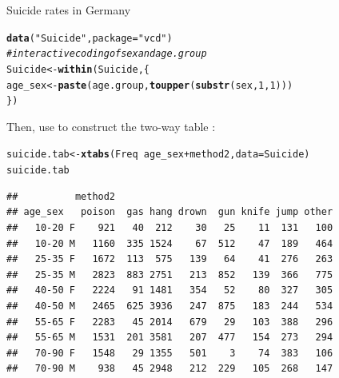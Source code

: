 \documentclass[11pt]{book}\usepackage[]{graphicx}\usepackage[]{color}
\makeatletter
\newcommand{\hlnum}[1]{\textcolor[rgb]{0.686,0.059,0.569}{#1}}%
\newcommand{\hlstr}[1]{\textcolor[rgb]{0.192,0.494,0.8}{#1}}%
\newcommand{\hlcom}[1]{\textcolor[rgb]{0.678,0.584,0.686}{\textit{#1}}}%
\newcommand{\hlopt}[1]{\textcolor[rgb]{0,0,0}{#1}}%
\newcommand{\hlstd}[1]{\textcolor[rgb]{0.345,0.345,0.345}{#1}}%
\newcommand{\hlkwb}[1]{\textcolor[rgb]{0.69,0.353,0.396}{#1}}%
\newcommand{\hlkwc}[1]{\textcolor[rgb]{0.333,0.667,0.333}{#1}}%
\newcommand{\hlkwd}[1]{\textcolor[rgb]{0.737,0.353,0.396}{\textbf{#1}}}%
\newenvironment{kframe}{%
 \def\at@end@of@kframe{}%
 \ifinner\ifhmode%
  \def\at@end@of@kframe{\end{minipage}}%
  \begin{minipage}{\columnwidth}%
 \fi\fi%
 \def\FrameCommand##1{\hskip\@totalleftmargin \hskip-\fboxsep
 \colorbox{shadecolor}{##1}\hskip-\fboxsep
     \hskip-\linewidth \hskip-\@totalleftmargin \hskip\columnwidth}%
 \MakeFramed {\advance\hsize-\width
   \@totalleftmargin\z@ \linewidth\hsize
   \@setminipage}}%
 {\par\unskip\endMakeFramed%
 \at@end@of@kframe}
\newenvironment{knitrout}{}{} %
\renewenvironment{knitrout}{\small\renewcommand{\baselinestretch}{.85}}{} %
\makeatother
\begin{document}
\begin{Example}[suicide1]{Suicide rates in Germany}
\begin{knitrout}
\color{fgcolor}\begin{kframe}
\begin{alltt}
\hlkwd{data}\hlstd{(}\hlstr{"Suicide"}\hlstd{,} \hlkwc{package}\hlstd{=}\hlstr{"vcd"}\hlstd{)}
\hlcom{# interactive coding of sex and age.group}
\hlstd{Suicide} \hlkwb{<-} \hlkwd{within}\hlstd{(Suicide, \{}
  \hlstd{age_sex} \hlkwb{<-} \hlkwd{paste}\hlstd{(age.group,} \hlkwd{toupper}\hlstd{(}\hlkwd{substr}\hlstd{(sex,}\hlnum{1}\hlstd{,}\hlnum{1}\hlstd{)))}
        \hlstd{\})}
\end{alltt}
\end{kframe}
\end{knitrout}

Then, use  to construct the two-way table :
\begin{knitrout}
\color{fgcolor}\begin{kframe}
\begin{alltt}
\hlstd{suicide.tab} \hlkwb{<-} \hlkwd{xtabs}\hlstd{(Freq} \hlopt{~} \hlstd{age_sex} \hlopt{+} \hlstd{method2,} \hlkwc{data}\hlstd{=Suicide)}
\hlstd{suicide.tab}
\end{alltt}
\begin{verbatim}
##          method2
## age_sex   poison  gas hang drown  gun knife jump other
##   10-20 F    921   40  212    30   25    11  131   100
##   10-20 M   1160  335 1524    67  512    47  189   464
##   25-35 F   1672  113  575   139   64    41  276   263
##   25-35 M   2823  883 2751   213  852   139  366   775
##   40-50 F   2224   91 1481   354   52    80  327   305
##   40-50 M   2465  625 3936   247  875   183  244   534
##   55-65 F   2283   45 2014   679   29   103  388   296
##   55-65 M   1531  201 3581   207  477   154  273   294
##   70-90 F   1548   29 1355   501    3    74  383   106
##   70-90 M    938   45 2948   212  229   105  268   147
\end{verbatim}
\end{kframe}
\end{knitrout}


\end{Example}
\end{document}
